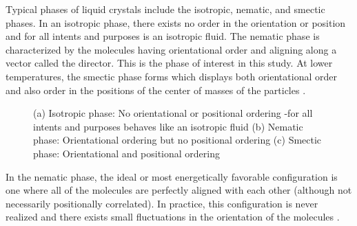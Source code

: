 \documentclass[preprint, aps]{revtex4-1}
\begin{document}
Typical phases of liquid crystals include the isotropic, nematic, and smectic 
phases. In an isotropic phase, there exists no order in the orientation or 
position and for all intents and purposes is an isotropic fluid. The nematic 
phase is characterized by the molecules having orientational order and aligning 
along a vector called the director. This is the phase of interest in this study. 
At lower temperatures, the smectic phase forms which displays both orientational
order and also order in the positions of the center of masses of the particles
\cite{andrienko06}.
	\begin{figure}[H] 
		\centering
		\caption{(a) Isotropic phase: No orientational or positional ordering
		-for all intents and purposes behaves like an isotropic fluid (b)
		Nematic phase: Orientational ordering but no positional ordering (c) 
		Smectic phase: Orientational and positional ordering}
		\label{fig:phases}
	\end{figure}

In the nematic phase, the ideal or most energetically favorable configuration is
 one where all of the molecules are perfectly aligned with each other (although 
not necessarily positionally correlated). In practice, this configuration is 
never realized and there exists small fluctuations in the orientation of the 
molecules \cite{degennes95}.
\end{document}

